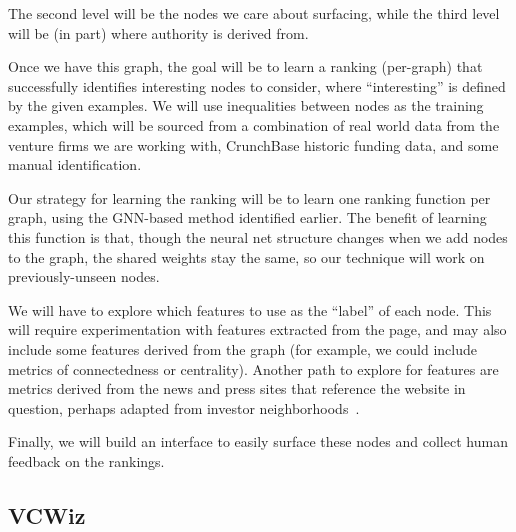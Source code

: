The second level will be the nodes we care about surfacing, while the third level will be (in part) where authority is derived from.

Once we have this graph, the goal will be to learn a ranking (per-graph) that successfully identifies interesting nodes to consider, where ``interesting'' is defined by the given examples. We will use inequalities between nodes as the training examples, which will be sourced from a combination of real world data from the venture firms we are working with, CrunchBase historic funding data, and some manual identification.

Our strategy for learning the ranking will be to learn one ranking function per graph, using the GNN-based method identified earlier. The benefit of learning this function is that, though the neural net structure changes when we add nodes to the graph, the shared weights stay the same, so our technique will work on previously-unseen nodes.

We will have to explore which features to use as the ``label'' of each node. This will require experimentation with features extracted from the page, and may also include some features derived from the graph (for example, we could include metrics of connectedness or centrality). Another path to explore for features are metrics derived from the news and press sites that reference the website in question, perhaps adapted from investor neighborhoods~\cite{2017arXiv170604229H}.

Finally, we will build an interface to easily surface these nodes and collect human feedback on the rankings.



\subsection{VCWiz}

